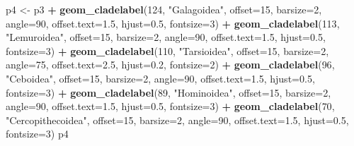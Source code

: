 \documentclass[]{book}
\newenvironment{Shaded}{\begin{snugshade}}{\end{snugshade}}
\newcommand{\KeywordTok}[1]{\textcolor[rgb]{0.13,0.29,0.53}{\textbf{#1}}}
\newcommand{\DataTypeTok}[1]{\textcolor[rgb]{0.13,0.29,0.53}{#1}}
\newcommand{\DecValTok}[1]{\textcolor[rgb]{0.00,0.00,0.81}{#1}}
\newcommand{\FloatTok}[1]{\textcolor[rgb]{0.00,0.00,0.81}{#1}}
\newcommand{\StringTok}[1]{\textcolor[rgb]{0.31,0.60,0.02}{#1}}
\newcommand{\OperatorTok}[1]{\textcolor[rgb]{0.81,0.36,0.00}{\textbf{#1}}}
\newcommand{\NormalTok}[1]{#1}
\begin{document}
\begin{Shaded}
\begin{Highlighting}[]
\NormalTok{p4 <-}\StringTok{ }\NormalTok{p3 }\OperatorTok{+}
\StringTok{  }\KeywordTok{geom_cladelabel}\NormalTok{(}\DecValTok{124}\NormalTok{, }\StringTok{"Galagoidea"}\NormalTok{, }\DataTypeTok{offset=}\DecValTok{15}\NormalTok{, }\DataTypeTok{barsize=}\DecValTok{2}\NormalTok{, }\DataTypeTok{angle=}\DecValTok{90}\NormalTok{,}
                  \DataTypeTok{offset.text=}\FloatTok{1.5}\NormalTok{, }\DataTypeTok{hjust=}\FloatTok{0.5}\NormalTok{, }\DataTypeTok{fontsize=}\DecValTok{3}\NormalTok{) }\OperatorTok{+}\StringTok{ }
\StringTok{  }\KeywordTok{geom_cladelabel}\NormalTok{(}\DecValTok{113}\NormalTok{, }\StringTok{"Lemuroidea"}\NormalTok{, }\DataTypeTok{offset=}\DecValTok{15}\NormalTok{, }\DataTypeTok{barsize=}\DecValTok{2}\NormalTok{, }\DataTypeTok{angle=}\DecValTok{90}\NormalTok{,}
                  \DataTypeTok{offset.text=}\FloatTok{1.5}\NormalTok{, }\DataTypeTok{hjust=}\FloatTok{0.5}\NormalTok{, }\DataTypeTok{fontsize=}\DecValTok{3}\NormalTok{) }\OperatorTok{+}
\StringTok{  }\KeywordTok{geom_cladelabel}\NormalTok{(}\DecValTok{110}\NormalTok{, }\StringTok{"Tarsioidea"}\NormalTok{, }\DataTypeTok{offset=}\DecValTok{15}\NormalTok{, }\DataTypeTok{barsize=}\DecValTok{2}\NormalTok{, }\DataTypeTok{angle=}\DecValTok{75}\NormalTok{,}
                  \DataTypeTok{offset.text=}\FloatTok{2.5}\NormalTok{, }\DataTypeTok{hjust=}\FloatTok{0.2}\NormalTok{, }\DataTypeTok{fontsize=}\DecValTok{2}\NormalTok{) }\OperatorTok{+}
\StringTok{  }\KeywordTok{geom_cladelabel}\NormalTok{(}\DecValTok{96}\NormalTok{, }\StringTok{"Ceboidea"}\NormalTok{, }\DataTypeTok{offset=}\DecValTok{15}\NormalTok{, }\DataTypeTok{barsize=}\DecValTok{2}\NormalTok{, }\DataTypeTok{angle=}\DecValTok{90}\NormalTok{,}
                  \DataTypeTok{offset.text=}\FloatTok{1.5}\NormalTok{, }\DataTypeTok{hjust=}\FloatTok{0.5}\NormalTok{, }\DataTypeTok{fontsize=}\DecValTok{3}\NormalTok{) }\OperatorTok{+}
\StringTok{  }\KeywordTok{geom_cladelabel}\NormalTok{(}\DecValTok{89}\NormalTok{, }\StringTok{"Hominoidea"}\NormalTok{, }\DataTypeTok{offset=}\DecValTok{15}\NormalTok{, }\DataTypeTok{barsize=}\DecValTok{2}\NormalTok{, }\DataTypeTok{angle=}\DecValTok{90}\NormalTok{,}
                  \DataTypeTok{offset.text=}\FloatTok{1.5}\NormalTok{, }\DataTypeTok{hjust=}\FloatTok{0.5}\NormalTok{, }\DataTypeTok{fontsize=}\DecValTok{3}\NormalTok{) }\OperatorTok{+}
\StringTok{  }\KeywordTok{geom_cladelabel}\NormalTok{(}\DecValTok{70}\NormalTok{, }\StringTok{"Cercopithecoidea"}\NormalTok{, }\DataTypeTok{offset=}\DecValTok{15}\NormalTok{, }\DataTypeTok{barsize=}\DecValTok{2}\NormalTok{, }\DataTypeTok{angle=}\DecValTok{90}\NormalTok{,}
                  \DataTypeTok{offset.text=}\FloatTok{1.5}\NormalTok{, }\DataTypeTok{hjust=}\FloatTok{0.5}\NormalTok{, }\DataTypeTok{fontsize=}\DecValTok{3}\NormalTok{)}
\NormalTok{p4}
\end{Highlighting}
\end{Shaded}
\end{document}
